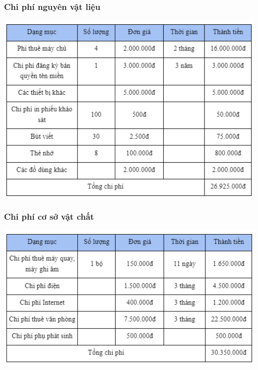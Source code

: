 \documentclass[12pt]{article}
\begin{document}
\subsubsection{Chi phí nguyên vật liệu}
\includegraphics[width=15cm]{ChiPhi10.png}
\vspace{0.5cm}

\subsubsection{Chi phí cơ sở vật chất}
\includegraphics[width=15cm]{ChiPhi11.png}
\vspace{0.5cm}
\end{document}

